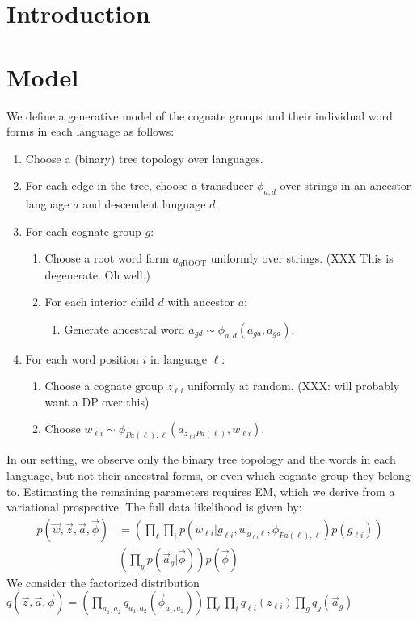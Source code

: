 \documentclass[11pt]{article}
\title{}
\author{}
\date{}
\begin{document}
\maketitle
\begin{abstract}
\end{abstract}
\section{Introduction}
\section{Model}

We define a generative model of the cognate groups and their individual word forms in each language as follows:
\begin{enumerate}
  \item Choose a (binary) tree topology over languages.
  \item For each edge in the tree, choose a transducer $\phi_{a,d}$ over strings in an ancestor language $a$ and descendent language $d$.
  \item For each cognate group $g$:
    \begin{enumerate}
      \item Choose a root word form $a_{g\mathrm{ROOT}}$ uniformly over strings. (XXX This is degenerate. Oh well.)
      \item For each interior child $d$ with ancestor $a$:
        \begin{enumerate}
          \item Generate ancestral word $a_{gd} \sim \phi_{a,d}(a_{ga},a_{gd})$.
        \end{enumerate}
    \end{enumerate}
  \item For each word position $i$ in language $\ell$:
    \begin{enumerate}
      \item Choose a cognate group $z_{\ell i}$ uniformly at random. (XXX: will probably want a DP over this)
      \item Choose $w_{\ell i} \sim \phi_{Pa(\ell),\ell}(a_{z_{\ell i}Pa(\ell)},w_{\ell i})$.
    \end{enumerate}
\end{enumerate}

In our setting, we observe only the binary tree topology and the words in each language, but not their ancestral forms, or even which cognate group they belong to. Estimating
the remaining parameters requires EM, which we derive from a variational prospective. The full data likelihood is given by:
\begin{equation}
  \begin{split}
    p(\vec w, \vec z, \vec a, \vec \phi) &= (\prod_\ell \prod_i p(w_{\ell i}|g_{\ell i},w_{g_{\ell i}\ell},\phi_{Pa(\ell),\ell})p(g_{\ell i}))\\
      & (\prod_g p(\vec a_g|\vec\phi) ) p(\vec \phi)
   \end{split}
 \end{equation}
 We consider the factorized distribution $q(\vec z, \vec a, \vec \phi) = (\prod_{a_1,a_2} q_{a_1,a_2}(\vec \phi_{a_1,a_2}))\prod_\ell \prod_i q_{\ell i}(z_{\ell i})\prod_g
 q_g(\vec a_g)$
\end{document}

